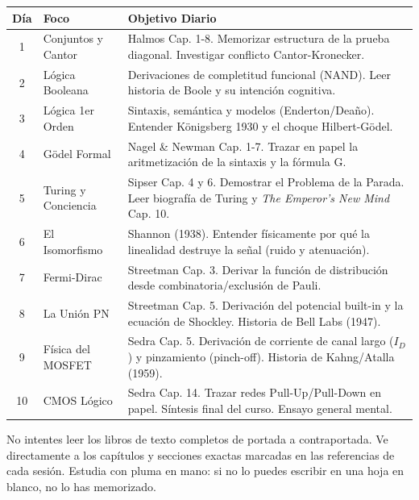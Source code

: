 \documentclass[11pt, letterpaper]{article}
\begin{document}
\begin{center}
\renewcommand{\arraystretch}{1.5}
\begin{tabular}{clp{9.5cm}}
\toprule
\textbf{D\'ia} & \textbf{Foco} & \textbf{Objetivo Diario} \\
\midrule
1 & Conjuntos y Cantor & Halmos Cap. 1-8. Memorizar estructura de la prueba diagonal. Investigar conflicto Cantor-Kronecker. \\
2 & L\'ogica Booleana & Derivaciones de completitud funcional (NAND). Leer historia de Boole y su intenci\'on cognitiva. \\
3 & L\'ogica 1er Orden & Sintaxis, sem\'antica y modelos (Enderton/Deaño). Entender K\"onigsberg 1930 y el choque Hilbert-G\"odel. \\
4 & G\"odel Formal & Nagel \& Newman Cap. 1-7. Trazar en papel la aritmetizaci\'on de la sintaxis y la f\'ormula G. \\
5 & Turing y Conciencia & Sipser Cap. 4 y 6. Demostrar el Problema de la Parada. Leer biograf\'ia de Turing y \textit{The Emperor's New Mind} Cap. 10. \\
6 & El Isomorfismo & Shannon (1938). Entender f\'isicamente por qu\'e la linealidad destruye la se\~nal (ruido y atenuaci\'on). \\
7 & Fermi-Dirac & Streetman Cap. 3. Derivar la funci\'on de distribuci\'on desde combinatoria/exclusi\'on de Pauli. \\
8 & La Uni\'on PN & Streetman Cap. 5. Derivaci\'on del potencial built-in y la ecuaci\'on de Shockley. Historia de Bell Labs (1947). \\
9 & F\'isica del MOSFET & Sedra Cap. 5. Derivaci\'on de corriente de canal largo ($I_D$) y pinzamiento (pinch-off). Historia de Kahng/Atalla (1959). \\
10 & CMOS L\'ogico & Sedra Cap. 14. Trazar redes Pull-Up/Pull-Down en papel. S\'intesis final del curso. Ensayo general mental. \\
\bottomrule
\end{tabular}
\end{center}

\begin{notapersonal}
No intentes leer los libros de texto completos de portada a contraportada. Ve directamente a los cap\'itulos y secciones exactas marcadas en las referencias de cada sesi\'on. Estudia con pluma en mano: si no lo puedes escribir en una hoja en blanco, no lo has memorizado.
\end{notapersonal}

\newpage
\end{document}
